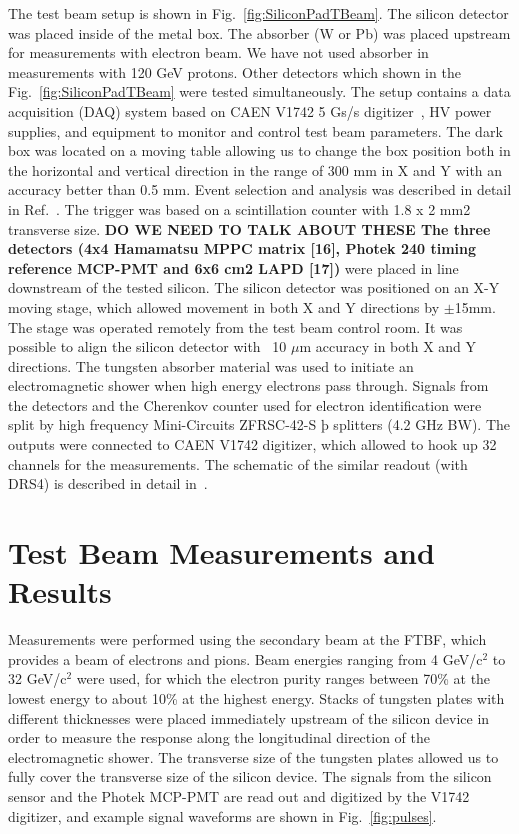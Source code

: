 \documentclass[12pt]{article}
\begin{document}
The test beam setup is shown in Fig.~\ref{fig:SiliconPadTBeam}. The silicon
detector was placed inside of the metal box. The absorber (W or Pb) was placed
upstream for measurements with electron beam. We have not used absorber in
measurements with 120 GeV protons. Other detectors which shown in the
Fig.~\ref{fig:SiliconPadTBeam} were tested simultaneously. The setup contains a data acquisition (DAQ) system based on CAEN V1742 5 Gs/s
digitizer~\cite{CAENDRS}, HV power supplies, and equipment to monitor and
control test beam parameters. The dark box was located on a moving table
allowing us to change the box position both in the horizontal and vertical
direction in the range of 300 mm in X and Y with an accuracy better than 0.5 mm.
Event selection and analysis was described in detail in
Ref.~\cite{MCPFastCaloNIMA}. The trigger was based on a scintillation counter
with 1.8 x 2 mm2 transverse size. \textbf{DO WE NEED TO TALK ABOUT THESE The
three detectors (4x4 Hamamatsu MPPC matrix [16], Photek 240 timing reference
MCP-PMT and 6x6 cm2 LAPD [17])} were placed in line downstream of the tested
silicon. The silicon detector was positioned on an X-Y moving stage, which
allowed movement in both X and Y directions by $\pm$15mm. The stage was operated
remotely from the test beam control room. It was possible to align the silicon
detector with ~10 $\mu$m accuracy in both X and Y directions. The tungsten absorber material was used to initiate an electromagnetic shower
when high energy electrons pass through. Signals from the detectors and the
Cherenkov counter used for electron identification were split by high frequency
Mini-Circuits ZFRSC-42-S þ splitters (4.2 GHz BW). The outputs were connected to
CAEN V1742 digitizer, which allowed to hook up 32 channels for the measurements.
The schematic of the similar readout (with DRS4) is described in detail in~\cite{Anderson:2015gha}. 

\section{Test Beam Measurements and Results} 
\label{sec:results} 

Measurements were performed using the secondary beam at the FTBF, which provides
a beam of electrons and pions. Beam energies ranging from 4 GeV/c$^2$ to 32 GeV/c$^2$
were used, for which the electron purity ranges between 70\% at the lowest
energy to about 10\% at the highest energy. Stacks of tungsten plates with
different thicknesses were placed immediately upstream of the silicon device in
order to measure the response along the longitudinal direction of the
electromagnetic shower. The transverse size of the tungsten plates allowed us to
fully cover the transverse size of the silicon device. The signals from the
silicon sensor and the Photek MCP-PMT are read out and digitized by the V1742
digitizer, and example signal waveforms are shown in Fig.~\ref{fig:pulses}.
\end{document}
